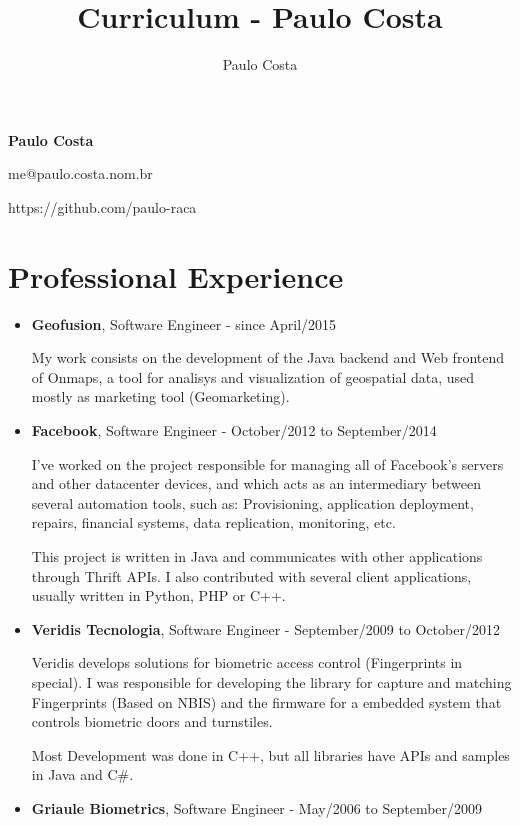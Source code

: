 \documentclass[a4paper,10pt]{article}
\title{Curriculum - Paulo Costa}
\author{Paulo Costa}
\begin{document}
  \LARGE\textbf{Paulo Costa}

  \large me@paulo.costa.nom.br
  
  \large https://github.com/paulo-raca



  \normalsize 
  
  \section{Professional Experience}
    \begin{itemize}
      \item
        \textbf{Geofusion}, Software Engineer - since April/2015
        
        My work consists on the development of the Java backend and Web frontend of Onmaps, a tool for analisys and visualization of geospatial data, used mostly as marketing tool (Geomarketing).

      \item
        \textbf{Facebook}, Software Engineer - October/2012 to September/2014
        
        I've worked on the project responsible for managing all of Facebook's servers and other datacenter devices, and which acts as an intermediary between several automation tools, such as: Provisioning, application deployment, repairs, financial systems, data replication, monitoring, etc.
        
        This project is written in Java and communicates with other applications through Thrift APIs. I also contributed with several client applications, usually written in Python, PHP or C++.

    
      \item  
        \textbf{Veridis Tecnologia}, Software Engineer - September/2009 to October/2012

        Veridis develops solutions for biometric access control (Fingerprints in special). I was responsible for developing the library for capture and  matching Fingerprints (Based on NBIS) and the firmware for a embedded system that controls biometric doors and turnstiles.
        
        Most Development was done in C++, but all libraries have APIs and samples in Java and C\#.

      \item  
        \textbf{Griaule Biometrics}, Software Engineer - May/2006 to September/2009


\end{itemize}
\end{document}
